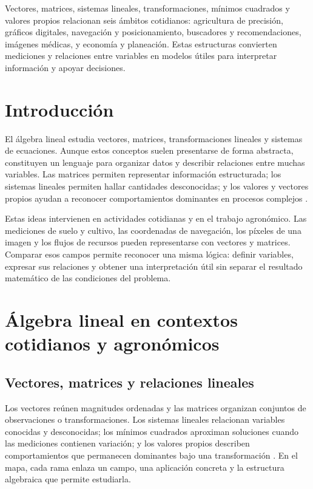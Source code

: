 \documentclass[spanish,letterpaper,oneside]{article}
\begin{document}
\templatePortrait
\templatePagecfg
\onehalfspacing

\begin{abstractd}
Vectores, matrices, sistemas lineales, transformaciones, mínimos cuadrados y valores propios relacionan seis ámbitos cotidianos: agricultura de precisión, gráficos digitales, navegación y posicionamiento, buscadores y recomendaciones, imágenes médicas, y economía y planeación. Estas estructuras convierten mediciones y relaciones entre variables en modelos útiles para interpretar información y apoyar decisiones.
\end{abstractd}

\templateIndex
\templateFinalcfg

\section{Introducción}
El álgebra lineal estudia vectores, matrices, transformaciones lineales y sistemas de ecuaciones. Aunque estos conceptos suelen presentarse de forma abstracta, constituyen un lenguaje para organizar datos y describir relaciones entre muchas variables. Las matrices permiten representar información estructurada; los sistemas lineales permiten hallar cantidades desconocidas; y los valores y vectores propios ayudan a reconocer comportamientos dominantes en procesos complejos \citep{lay2021linear,strang2023introduction}.

Estas ideas intervienen en actividades cotidianas y en el trabajo agronómico. Las mediciones de suelo y cultivo, las coordenadas de navegación, los píxeles de una imagen y los flujos de recursos pueden representarse con vectores y matrices. Comparar esos campos permite reconocer una misma lógica: definir variables, expresar sus relaciones y obtener una interpretación útil sin separar el resultado matemático de las condiciones del problema.

\section{Álgebra lineal en contextos cotidianos y agronómicos}
\subsection{Vectores, matrices y relaciones lineales}
Los vectores reúnen magnitudes ordenadas y las matrices organizan conjuntos de observaciones o transformaciones. Los sistemas lineales relacionan variables conocidas y desconocidas; los mínimos cuadrados aproximan soluciones cuando las mediciones contienen variación; y los valores propios describen comportamientos que permanecen dominantes bajo una transformación \citep{meyer2000matrix}. En el mapa, cada rama enlaza un campo, una aplicación concreta y la estructura algebraica que permite estudiarla.
\end{document}
